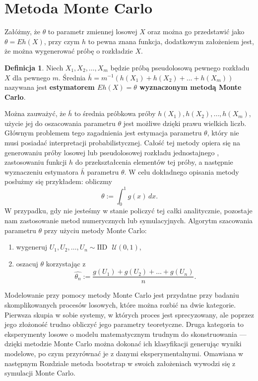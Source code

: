 \documentclass[inzynierska]{pwr_wmat_praca_dyplomowa}
\theoremstyle{plain}
\numberwithin{theorem}{chapter}
\theoremstyle{definition}
\numberwithin{theorem}{chapter}
\newtheorem{definition}[theorem]{Definicja}
\begin{document}
\section{Metoda Monte Carlo}
Załóżmy, że $\theta$ to parametr zmiennej losowej $X$ oraz można go przedstawić jako $\theta=Eh(X)$, przy czym $h$ to pewna znana funkcja, dodatkowym założeniem jest, że można wygenerować próbę o rozkładzie $X$. \cite{monte}
\begin{definition}
	Niech $X_1,X_2,\dots,X_m$ będzie próbą pseudolosową pewnego rozkładu $X$ dla pewnego $m$. Średnia $\bar{h}=m^{-1}(h(X_1)+h(X_2)+\dots +h(X_m))$ nazywana jest \textbf{estymatorem $Eh(X)=\theta$ wyznaczonym metodą Monte Carlo}.
\end{definition}
Można zauważyć, że $\bar{h}$ to średnia próbkowa próby $h(X_1),h(X_2),\dots ,h(X_m)$, użycie jej do oszacowania parametru $\theta$ jest możliwe dzięki prawu wielkich liczb. Głównym problemem tego zagadnienia jest estymacja parametru $\theta$, który nie musi posiadać interpretacji probabilistycznej. Całość tej metody opiera się na generowaniu próby losowej lub pseudolosowej rozkładu jednostajnego , zastosowaniu funkcji $h$ do przekształcenia elementów tej próby, a następnie wyznaczeniu estymatora $\bar{h}$ parametru $\theta$. 
W celu dokładnego opisania metody posłużmy się przykładem: obliczmy
\begin{equation}
	\theta:=\int_{0}^{1}g(x)\,dx.
\end{equation}
W przypadku, gdy nie jesteśmy w stanie policzyć tej całki analitycznie, pozostaje nam zastosowanie metod numerycznych lub symulacyjnych. Algorytm szacowania parametru $\theta$ przy użyciu metody Monte Carlo:
\begin{enumerate}
	\item wygeneruj $U_1,U_2,\dots, U_n \sim \text{IID}\,\,\,\, \mathcal{U}(0,1)$,
	\item oszacuj $\theta$ korzystając z
	\begin{equation}
		\hat{\theta_n}:= \frac{g(U_1)+g(U_2)+\dots+g(U_n)}{n}.
	\end{equation}
\end{enumerate} 

Modelowanie przy pomocy metody Monte Carlo jest przydatne przy badaniu skomplikowanych procesów losowych, które można rozbić na dwie kategorie. Pierwsza skupia w sobie systemy, w których proces jest sprecyzowany, ale poprzez jego złożoność trudno obliczyć jego parametry teoretyczne. Druga kategoria to eksperymenty losowe o modelu matematycznym trudnym do skonstruowania --- dzięki metodzie Monte Carlo można dokonać ich klasyfikacji generując wyniki modelowe, po czym przyrównać je z danymi eksperymentalnymi. Omawiana w następnym Rozdziale metoda bootstrap w swoich założeniach wywodzi się z symulacji Monte Carlo.
\end{document}

